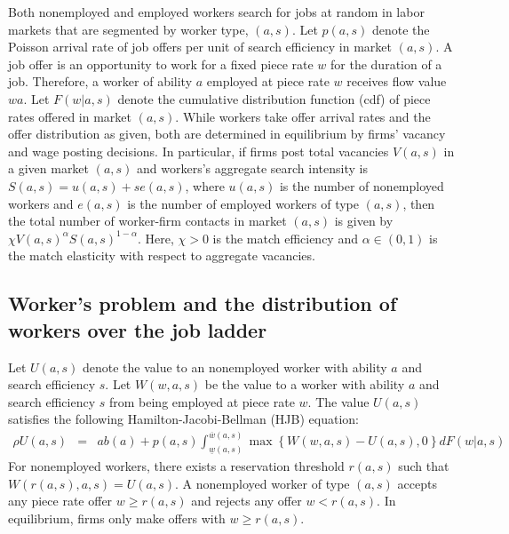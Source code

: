Both nonemployed and employed workers search for jobs at random in labor markets that are segmented by worker type, $(a,s)$. Let $p(a,s)$ denote the Poisson arrival rate of job offers per unit of search efficiency in market $(a,s)$. A job offer is an opportunity to work for a fixed piece rate $w$ for the duration of a job. Therefore, a worker of ability $a$ employed at piece rate $w$ receives flow value $wa$. Let $F(w|a,s)$ denote the cumulative distribution function (cdf) of piece rates offered in market $(a,s)$. While workers take offer arrival rates and the offer distribution as given, both are determined in equilibrium by firms' vacancy and wage posting decisions. In particular, if firms post total vacancies $V(a,s)$ in a given market $(a,s)$ and workers's aggregate search intensity is $S(a,s) = u(a,s)+se(a,s)$, where $u(a,s)$ is the number of nonemployed workers and $e(a,s)$ is the number of employed workers of type $(a,s)$, then the total number of worker-firm contacts in market $(a,s)$ is given by $\chi V(a,s)^{\alpha}S(a,s)^{1-\alpha}$. Here, $\chi>0$ is the match efficiency and $\alpha\in(0,1)$ is the match elasticity with respect to aggregate vacancies.




\subsection{Worker's problem and the distribution of workers over the job ladder}

Let $U(a,s)$ denote the value to an nonemployed worker with ability $a$ and search efficiency $s$. Let $W(w,a,s)$ be the value to a worker with ability $a$ and search efficiency $s$ from being employed at piece rate $w$. The value $U(a,s)$ satisfies the following Hamilton-Jacobi-Bellman (HJB) equation:
%
\begin{eqnarray}
  \label{eq: value of unemployment}
  \rho U\left(a,s\right) &=& a b\left(a\right) + p(a,s)\int_{\underline{w}(a,s)}^{\overline{w}(a,s)}\max\left\{ W(w,a,s)-U\left(a,s\right),0\right\} dF\left(w\left|a,s\right.\right)
\end{eqnarray}
%
For nonemployed workers, there exists a reservation threshold $r(a,s)$ such that $W(r(a,s),a,s)=U\left(a,s\right)$. A nonemployed worker of type $(a,s)$ accepts any piece rate offer $w \geq r(a,s)$ and rejects any offer $w < r(a,s)$. In equilibrium, firms only make offers with $w \geq r(a,s)$.


